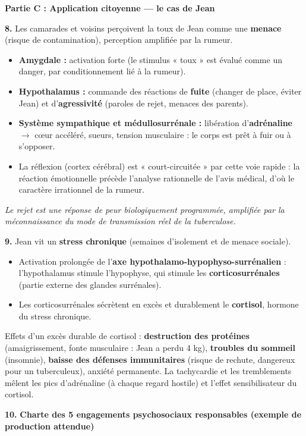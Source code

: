 \documentclass[11pt]{article}
\begin{document}
\begin{exoresolu}
\textbf{Partie C : Application citoyenne — le cas de Jean}

\textbf{8.} Les camarades et voisins perçoivent la toux de Jean comme une \textbf{menace} (risque de contamination), perception amplifiée par la rumeur.
\begin{itemize}
    \item \textbf{Amygdale :} activation forte (le stimulus « toux » est évalué comme un danger, par conditionnement lié à la rumeur).
    \item \textbf{Hypothalamus :} commande des réactions de \textbf{fuite} (changer de place, éviter Jean) et d'\textbf{agressivité} (paroles de rejet, menaces des parents).
    \item \textbf{Système sympathique et médullosurrénale :} libération d'\textbf{adrénaline} $\rightarrow$ cœur accéléré, sueurs, tension musculaire : le corps est prêt à fuir ou à s'opposer.
    \item La réflexion (cortex cérébral) est « court-circuitée » par cette voie rapide : la réaction émotionnelle précède l'analyse rationnelle de l'avis médical, d'où le caractère irrationnel de la rumeur.
\end{itemize}
\emph{Le rejet est une réponse de peur biologiquement programmée, amplifiée par la méconnaissance du mode de transmission réel de la tuberculose.}

\textbf{9.} Jean vit un \textbf{stress chronique} (semaines d'isolement et de menace sociale).
\begin{itemize}
    \item Activation prolongée de l'\textbf{axe hypothalamo-hypophyso-surrénalien} : l'hypothalamus stimule l'hypophyse, qui stimule les \textbf{corticosurrénales} (partie externe des glandes surrénales).
    \item Les corticosurrénales sécrètent en excès et durablement le \textbf{cortisol}, hormone du stress chronique.
\end{itemize}
Effets d'un excès durable de cortisol : \textbf{destruction des protéines} (amaigrissement, fonte musculaire : Jean a perdu 4 kg), \textbf{troubles du sommeil} (insomnie), \textbf{baisse des défenses immunitaires} (risque de rechute, dangereux pour un tuberculeux), anxiété permanente. La tachycardie et les tremblements mêlent les pics d'adrénaline (à chaque regard hostile) et l'effet sensibilisateur du cortisol.

\textbf{10.} \textbf{Charte des 5 engagements psychosociaux responsables (exemple de production attendue)}


\end{exoresolu}
\end{document}
